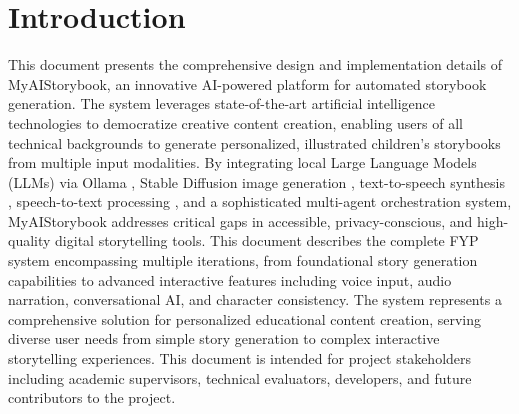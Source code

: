 \chapter{Introduction}
\label{sec:introduction}
This document presents the comprehensive design and implementation details of MyAIStorybook, an innovative AI-powered platform for automated storybook generation. The system leverages state-of-the-art artificial intelligence technologies to democratize creative content creation, enabling users of all technical backgrounds to generate personalized, illustrated children's storybooks from multiple input modalities. By integrating local Large Language Models (LLMs) via Ollama \cite{ollama2024}, Stable Diffusion image generation \cite{rombach2022highresolution, stablediffusion2022}, text-to-speech synthesis \cite{coqui2024}, speech-to-text processing \cite{whisper2023}, and a sophisticated multi-agent orchestration system, MyAIStorybook addresses critical gaps in accessible, privacy-conscious, and high-quality digital storytelling tools. This document describes the complete FYP system encompassing multiple iterations, from foundational story generation capabilities to advanced interactive features including voice input, audio narration, conversational AI, and character consistency. The system represents a comprehensive solution for personalized educational content creation, serving diverse user needs from simple story generation to complex interactive storytelling experiences. This document is intended for project stakeholders including academic supervisors, technical evaluators, developers, and future contributors to the project.

